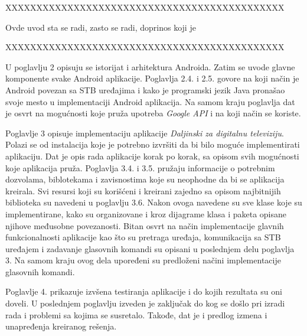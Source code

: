 \documentclass[TamaraIvanovicMasterRad.tex]{subfiles}
\begin{document}
XXXXXXXXXXXXXXXXXXXXXXXXXXXXXXXXXXXXXXXXXXXXX

Ovde uvod sta se radi, zasto se radi, doprinos koji je

XXXXXXXXXXXXXXXXXXXXXXXXXXXXXXXXXXXXXXXXXXXXX


U poglavlju 2 opisuju se istorijat i arhitektura Androida. Zatim se uvode glavne komponente svake Android aplikacije. Poglavlja 2.4. i 2.5. govore na koji način je Android povezan sa STB uređajima i kako je programski jezik Java pronašao svoje mesto u implementaciji Android aplikacija. Na samom kraju poglavlja dat je osvrt na mogućnosti koje pruža upotreba \textit{Google API} i na koji način se koriste.

Poglavlje 3 opisuje implementaciju aplikacije \textit{Daljinski za digitalnu televiziju}. Polazi se od instalacija koje je potrebno izvršiti da bi bilo moguće implementirati aplikaciju. Dat je opis rada aplikacije korak po korak, sa opisom svih mogućnosti koje aplikacija pruža. Poglavlja 3.4. i 3.5. pružaju informacije o potrebnim dozvolama, biblotekama i zavisnostima koje su neophodne da bi se aplikacija kreirala. Svi resursi koji su korišćeni i kreirani zajedno sa opisom najbitnijih biblioteka su navedeni u poglavlju 3.6. Nakon ovoga navedene su sve klase koje su implementirane, kako su organizovane i kroz dijagrame klasa i paketa opisane njihove međusobne povezanosti. Bitan osvrt na način implementacije glavnih funkcionalnosti aplikacije kao što su pretraga uređaja, komunikacija sa STB uređajem i zadavanje glasovnih komandi su opisani u poslednjem delu poglavlja 3. Na samom kraju ovog dela upoređeni su predloženi načini implementacije glasovnih komandi. 

Poglavlje 4. prikazuje izvšena testiranja aplikacije i do kojih rezultata su oni doveli.
U poslednjem poglavlju izveden je zaključak do kog se došlo pri izradi rada i problemi sa kojima se susretalo. Takođe, dat je i predlog izmena i unapređenja kreiranog rešenja.
\end{document}
